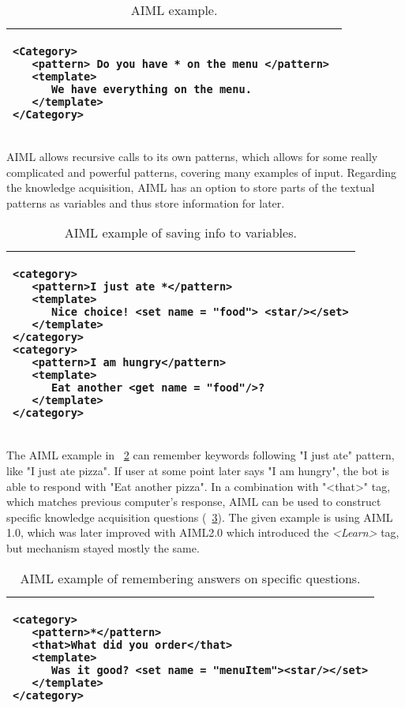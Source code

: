 \begin{table}[htb]
\caption{AIML example.}
\label{tab:aiml_example}
\centering
\begin{tabular}{l}
\hline
\lstset{language=XML,breaklines=true}
\begin{lstlisting}
<Category> 
   <pattern> Do you have * on the menu </pattern> 
   <template>
      We have everything on the menu.
   </template> 
</Category>
\end{lstlisting}  \\
\hline
\end{tabular}
\end{table}

AIML allows recursive calls to its own patterns, which allows for some really 
complicated
and powerful patterns, covering many examples of input. Regarding the knowledge 
acquisition,
AIML has an option to store parts of the textual patterns as variables and thus 
store 
information for later. 

\begin{table}[htb]
	\caption{AIML example of saving info to variables.}
	\label{tab:aiml_ka1}
	\centering
	\begin{tabular}{l}
		\hline
		\lstset{language=XML,breaklines=true}
		\begin{lstlisting}
<category>
   <pattern>I just ate *</pattern>
   <template>
      Nice choice! <set name = "food"> <star/></set>
   </template>  
</category>  
<category>
   <pattern>I am hungry</pattern>
   <template>
      Eat another <get name = "food"/>?
   </template>  
</category> 
		\end{lstlisting}  \\
		\hline
	\end{tabular}
\end{table}

The AIML example in \tablename~\ref{tab:aiml_ka1} can remember keywords
following "I just ate" pattern, like "I just ate pizza". If user at some point 
later says "I am hungry", the bot is able to respond with "Eat another pizza". 
In a combination with "<that>" tag, which matches previous computer's response, 
AIML can be used to construct specific knowledge acquisition questions 
(\tablename~\ref{tab:aiml_ka2}).  The given example is using AIML 1.0, which
was later improved with AIML2.0 \parencite{Wallace2013} which introduced the
\emph{<Learn>} tag, but mechanism stayed mostly the same.

\begin{table}[htb]
	\caption{AIML example of remembering answers on specific questions.}
	\label{tab:aiml_ka2}
	\centering
	\begin{tabular}{l}
		\hline
		\lstset{language=XML,breaklines=true}
		\begin{lstlisting}
<category>
   <pattern>*</pattern>
   <that>What did you order</that>
   <template> 
      Was it good? <set name = "menuItem"><star/></set>
   </template>  
</category>  
		\end{lstlisting}  \\
		\hline
	\end{tabular}
\end{table}

